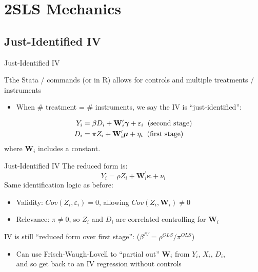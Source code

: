 \documentclass{beamer}
\begin{document}
\section{2SLS Mechanics}

\subsection{Just-Identified IV}
\begin{frame}{Just-Identified IV}

Tthe Stata / commands (or  in R) allows for controls and multiple treatments / instruments
\begin{itemize}
  \item When \# treatment = \# instruments, we say the IV is ``just-identified'':
\end{itemize}\pause\vspace{-0.7cm}

\begin{align*}
Y_i &=  \beta D_i +\mathbf{W}_i^\prime\boldsymbol{\gamma} +  \varepsilon_i\hspace{0.2cm}\text{(second stage)}\\
D_i &= \pi Z_i + \mathbf{W}_i^\prime\boldsymbol{\mu} + \eta_i\hspace{0.2cm}\text{(first stage)}
\end{align*}
where $\mathbf{W}_i$ includes a constant.
\end{frame}

\begin{frame}{Just-Identified IV}
The reduced form is: $$Y_i= \rho Z_i + \mathbf{W}_i^\prime\boldsymbol{\kappa}+\nu_i $$\pause
Same identification logic as before:

\begin{itemize}
  \item Validity: $Cov(Z_i,\varepsilon_i)=0$, allowing $Cov(Z_i,\mathbf{W}_i)\neq 0$\pause
  \item Relevance: $\pi\neq 0$, so $Z_i$ and $D_i$ are correlated controlling for $\mathbf{W}_i$
\end{itemize}\pause\medskip

IV is still ``reduced form over first stage'': ($\beta^{IV}=\rho^{OLS}/\pi^{OLS}$)\pause\vspace{0.1cm}
\begin{itemize}
  \item Can use Frisch-Waugh-Lovell to ``partial out'' $\mathbf{W}_i$ from $Y_i$, $X_i$, $D_i$, \\ and so get back to an IV regression without controls
\end{itemize}
\end{frame}
\end{document}
